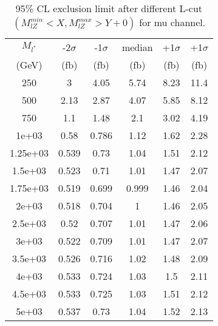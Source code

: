 \documentclass[]{article}
\begin{document}
\begin{table}
\begin{center}
\begin{tabular}{cccccc}
\hline 
\hline 
$M_{l^*}$ & -2$\sigma$ & -1$\sigma$ & median & +1$\sigma$ & +1$\sigma$\\ 
(GeV) & (fb) & (fb) & (fb) & (fb) & (fb)  \\ 
\hline 
\hline 
250 & 3 & 4.05 & 5.74 & 8.23 & 11.4\\
500 & 2.13 & 2.87 & 4.07 & 5.85 & 8.12\\
750 & 1.1 & 1.48 & 2.1 & 3.02 & 4.19\\
1e+03 & 0.58 & 0.786 & 1.12 & 1.62 & 2.28\\
1.25e+03 & 0.539 & 0.73 & 1.04 & 1.51 & 2.12\\
1.5e+03 & 0.523 & 0.71 & 1.01 & 1.47 & 2.07\\
1.75e+03 & 0.519 & 0.699 & 0.999 & 1.46 & 2.04\\
2e+03 & 0.518 & 0.704 & 1 & 1.46 & 2.05\\
2.5e+03 & 0.52 & 0.707 & 1.01 & 1.47 & 2.06\\
3e+03 & 0.522 & 0.709 & 1.01 & 1.47 & 2.07\\
3.5e+03 & 0.526 & 0.716 & 1.02 & 1.48 & 2.09\\
4e+03 & 0.533 & 0.724 & 1.03 & 1.5 & 2.11\\
4.5e+03 & 0.533 & 0.725 & 1.03 & 1.51 & 2.12\\
5e+03 & 0.537 & 0.73 & 1.04 & 1.52 & 2.13\\
\hline 
\end{tabular}
\caption{95\% CL exclusion limit after different L-cut $(M_{lZ}^{min} < X, M_{lZ}^{max} > Y + 0)$ for mu channel.}
\label{tab:limit_muon}
\end{center}
\end{table}
\end{document}
